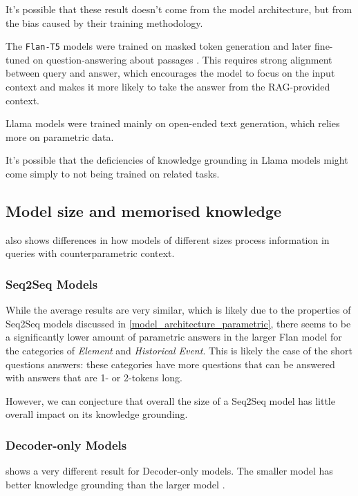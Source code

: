 It's possible that these result doesn't come from the model architecture, but from the bias caused by their training methodology.

The \texttt{Flan-T5} models were trained on masked token generation and later fine-tuned on question-answering about passages \cite{flant5}.
This requires strong alignment between query and answer, which encourages the model to focus on the input context and makes it more likely to take the answer from the RAG-provided context.

Llama models were trained mainly on open-ended text generation, which relies more on parametric data.

It's possible that the deficiencies of knowledge grounding in Llama models might come simply to not being trained on related tasks.

\subsection{Model size and memorised knowledge}
\label{model_size_parametric}

 also shows differences in how models of different sizes process information in queries with counterparametric context.

\subsubsection{Seq2Seq Models}

While the average results are very similar, which is likely due to the properties of Seq2Seq models discussed in \cref{model_architecture_parametric}, there seems to be a significantly lower amount of parametric answers in the larger Flan model for the categories of \emph{Element} and \emph{Historical Event}.
This is likely the case of the short questions answers: these categories have more questions that can be answered with answers that are 1- or 2-tokens long.

However, we can conjecture that overall the size of a Seq2Seq model has little overall impact on its knowledge grounding.

\subsubsection{Decoder-only Models}

 shows a very different result for Decoder-only models.
The smaller model \smallllama{} has better knowledge grounding than the larger model \bigllama{}.

